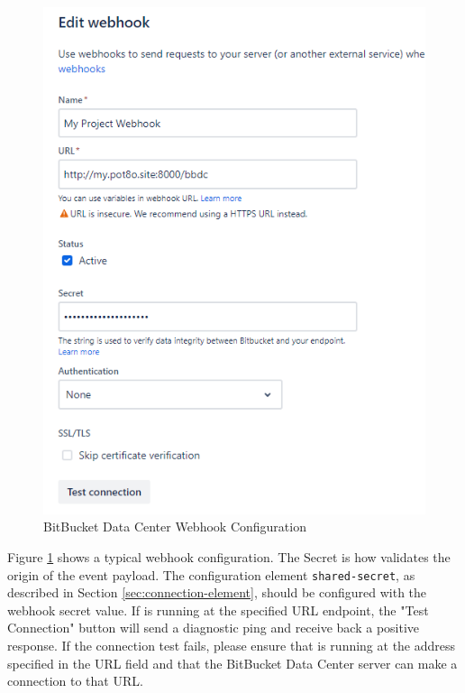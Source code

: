 \begin{figure}[h]
    \includegraphics[width=\textwidth]{graphics/bbdc-webhook-config.png}
    \caption{BitBucket Data Center Webhook Configuration}
    \label{fig:bbdc-webhook-config}
\end{figure}



Figure \ref{fig:bbdc-webhook-config} shows a typical webhook configuration.  The Secret is how \cxoneflow
validates the origin of the event payload.  The configuration element \texttt{shared-secret}, as described
in Section \ref{sec:connection-element}, should be configured with the webhook secret value.  If \cxoneflow
is running at the specified URL endpoint, the "Test Connection" button will send a diagnostic ping
and receive back a positive response.  If the connection test fails, please ensure that \cxoneflow is running
at the address specified in the URL field and that the BitBucket Data Center server can make a connection
to that URL.

